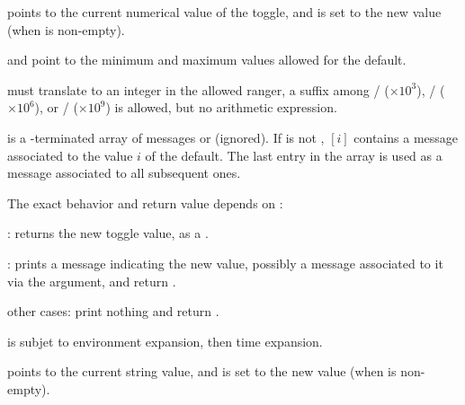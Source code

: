 
\item {} points to the current numerical value of the toggle, and is set
to the new value (when  is non-empty).

\item {} and  point to the minimum and maximum values allowed
for the default.

\item {} must translate to an integer in the allowed ranger, a suffix
among
/ ($\times 10^3$),
/ ($\times 10^6$),
or
/ ($\times 10^9$) is allowed, but no arithmetic expression.

\item {} is a \kbd[NULL]-terminated array of messages or 
(ignored). If  is not , $[i]$ contains
a message associated to the value $i$ of the default. The last entry in the
 array is used as a message associated to all subsequent ones.

The exact behavior and return value depends on :

\item {}: returns the new toggle value, as a .

\item {}: prints a message indicating the new value,
possibly a message associated to it via the  argument, and return
.

\item other cases: print nothing and return .

\item {} is subjet to environment expansion, then time expansion.

\item {} points to the current string value, and is set to the new
value (when  is non-empty).
